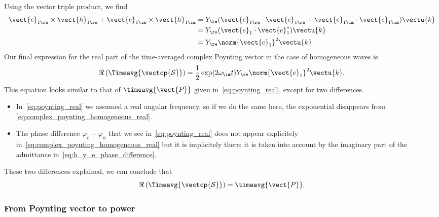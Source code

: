 Using the vector triple product, we find
\begin{subequations}
\begin{align}
    \vect{e}_{1\re} \times \vect{h}_{1\re}
    +
    \vect{e}_{1\im} \times \vect{h}_{1\im}
    &=
    Y_\re (\vect{e}_{1\re} \cdot \vect{e}_{1\re} +
         \vect{e}_{1\im} \cdot \vect{e}_{1\im}) \vectu{k}
    \\
    &=
    Y_\re (\vect{e}_1 \cdot \vect{e}_1^*) \vectu{k}
    \\
    &=
    Y_\re \norm{\vect{e}_1}^2 \vectu{k}
\end{align}
\end{subequations}
Our final expression for the real part of the time-averaged complex Poynting vector in the case of homogeneous waves is
\begin{equation}
    \Re\left( \Timeavg{\vectcp{\mathcal{S}}} \right)
    =
    \frac{1}{2}
    \exp(2\omega_\im t)
    Y_\re %
    \norm{\vect{e}_1}^2
    \vectu{k}
    \text{.}
    \label{eq:complex_poynting_homogeneous_real}
\end{equation}
This equation looks similar to that of $\timeavg{\vect{P}}$ given in~\cref{eq:poynting_real}, except for two differences.
\begin{itemize}
    \item 
In~\cref{eq:poynting_real} we assumed a real angular frequency, so if we do the same here, the exponential disappears from \cref{eq:complex_poynting_homogeneous_real}.
    \item
The phase difference $\varphi_e-\varphi_h$ that we see in~\cref{eq:poynting_real} does not appear explicitely in~\cref{eq:complex_poynting_homogeneous_real} but it is implicitely there:
it is taken into account by the imaginary part of the admittance in~\cref{eq:h_y_e_phase_difference}.
\end{itemize}
These two differences explained, we can conclude that
\begin{equation}
    \Re\left( \Timeavg{\vectcp{\mathcal{S}}} \right) = \timeavg{\vect{P}}
    \text{.}
\end{equation}



\subsubsection{From Poynting vector to power}

